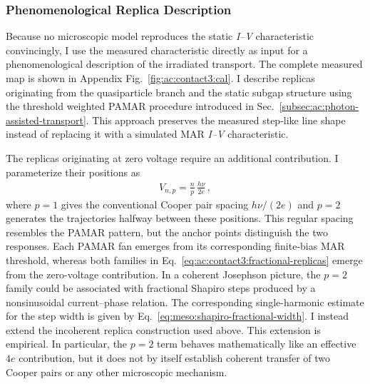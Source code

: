     \subsubsection*{Phenomenological Replica Description}

        Because no microscopic model reproduces the static \textit{I--V} characteristic convincingly, I use the measured characteristic directly as input for a phenomenological description of the irradiated transport. The complete measured map is shown in Appendix Fig.~\ref{fig:ac:contact3:cal}. I describe replicas originating from the quasiparticle branch and the static subgap structure using the threshold weighted PAMAR procedure introduced in Sec.~\ref{subsec:ac:photon-assisted-transport}. This approach preserves the measured step-like line shape instead of replacing it with a simulated MAR \textit{I--V} characteristic.

        The replicas originating at zero voltage require an additional contribution. I parameterize their positions as
        \begin{align}
            V_{n,p} = \frac{n}{p}\,\frac{h\nu}{2e}\,,
            \label{eq:ac:contact3:fractional-replicas}
        \end{align}
        where $p=1$ gives the conventional Cooper pair spacing $h\nu/(2e)$ and $p=2$ generates the trajectories halfway between these positions. This regular spacing resembles the PAMAR pattern, but the anchor points distinguish the two responses. Each PAMAR fan emerges from its corresponding finite-bias MAR threshold, whereas both families in Eq.~\eqref{eq:ac:contact3:fractional-replicas} emerge from the zero-voltage contribution. In a coherent Josephson picture, the $p=2$ family could be associated with fractional Shapiro steps produced by a nonsinusoidal current--phase relation. The corresponding single-harmonic estimate for the step width is given by Eq.~\eqref{eq:meso:shapiro-fractional-width}. I instead extend the incoherent replica construction used above. This extension is empirical. In particular, the $p=2$ term behaves mathematically like an effective $4e$ contribution, but it does not by itself establish coherent transfer of two Cooper pairs or any other microscopic mechanism.

